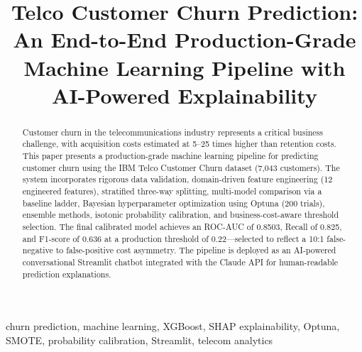 \documentclass[conference]{IEEEtran}
\begin{document}
\title{Telco Customer Churn Prediction: An End-to-End Production-Grade\\
Machine Learning Pipeline with AI-Powered Explainability}

\author{
}

\maketitle

\begin{abstract}
Customer churn in the telecommunications industry represents a critical business challenge, with acquisition costs estimated at 5--25 times higher than retention costs. This paper presents a production-grade machine learning pipeline for predicting customer churn using the IBM Telco Customer Churn dataset (7,043 customers). The system incorporates rigorous data validation, domain-driven feature engineering (12 engineered features), stratified three-way splitting, multi-model comparison via a baseline ladder, Bayesian hyperparameter optimization using Optuna (200 trials), ensemble methods, isotonic probability calibration, and business-cost-aware threshold selection. The final calibrated model achieves an ROC-AUC of 0.8503, Recall of 0.825, and F1-score of 0.636 at a production threshold of 0.22---selected to reflect a 10:1 false-negative to false-positive cost asymmetry. The pipeline is deployed as an AI-powered conversational Streamlit chatbot integrated with the Claude API for human-readable prediction explanations.
\end{abstract}

\begin{IEEEkeywords}
churn prediction, machine learning, XGBoost, SHAP explainability, Optuna, SMOTE, probability calibration, Streamlit, telecom analytics
\end{IEEEkeywords}
\end{document}
